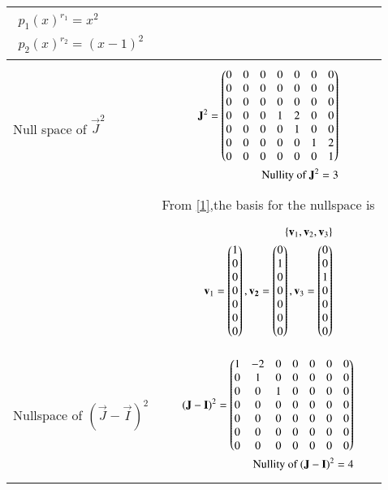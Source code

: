 \documentclass[journal,12pt,onecolumn]{IEEEtran}
\begin{document}
\begin{longtable}{|p{5cm}|p{13cm}|}
{\begin{align}
      {p_{1} (x)}^{r_{1}}=x^2\\
      {p_{2} (x)}^{r_{2}}=(x-1)^2
\end{align}}\\
\hline
 Null space of $\vec{J}^2$&
 \parbox{12cm}{\begin{align}
   \mathbf{J}^2=\begin{pmatrix}0&0&0&0&0&0&0\\0&0&0&0&0&0&0\\0&0&0&0&0&0&0\\0&0&0&1&2&0&0\\0&0&0&0&1&0&0\\0&0&0&0&0&1&2\\0&0&0&0&0&0&1\end{pmatrix}\label{1}\\
   \text{Nullity of } \mathbf{J}^2=3
\end{align}}\\
& From \eqref{1},the basis for the nullspace is\\
& \parbox{12cm}{\begin{align}
  \left\{\mathbf{v}_1,\mathbf{v}_2,\mathbf{v}_3\right\}\\
    \mathbf{v}_1=\begin{pmatrix}1\\0\\0\\0\\0\\0\\0\end{pmatrix},\mathbf{v_2}=\begin{pmatrix}0\\1\\0\\0\\0\\0\\0\end{pmatrix},\mathbf{v}_3=\begin{pmatrix}0\\0\\1\\0\\0\\0\\0\end{pmatrix}
\end{align}} \\
\hline
Nullspace of $(\vec{J}-\vec{I})^2$ &
\parbox{12cm}{\begin{align}
   (\vec{J}-\vec{I})^2=\myvec{1&-2&0&0&0&0&0\\0&1&0&0&0&0&0\\0&0&1&0&0&0&0\\0&0&0&0&0&0&0\\0&0&0&0&0&0&0\\0&0&0&0&0&0&0\\0&0&0&0&0&0&0}  \label{2}\\
   \text{Nullity of }  (\vec{J}-\vec{I})^2=4

\end{align}}
\end{longtable}
\end{document}
